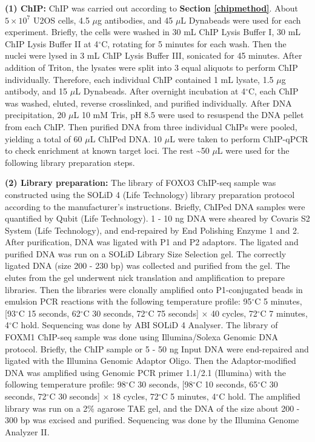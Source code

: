 \textbf{(1) ChIP:} ChIP was carried out according to \textbf{Section \ref{chipmethod}}. About $5 \times 10^7$ U2OS cells, 4.5 $\mu$g antibodies, and 45 $\mu$L Dynabeads were used for each experiment. Briefly, the cells were washed in 30 mL ChIP Lysis Buffer I, 30 mL ChIP Lysis Buffer II at 4$^\circ$C, rotating for 5 minutes for each wash. Then the nuclei were lysed in 3 mL ChIP Lysis Buffer III, sonicated for 45 minutes. After addition of Triton, the lysates were split into 3 equal aliquots to perform ChIP individually. Therefore, each individual ChIP contained 1 mL lysate, 1.5 $\mu$g antibody, and 15 $\mu$L Dynabeads. After overnight incubation at 4$^\circ$C, each ChIP was washed, eluted, reverse crosslinked, and purified individually. After DNA precipitation, 20 $\mu$L 10 mM Tris, pH 8.5 were used to resuspend the DNA pellet from each ChIP. Then purified DNA from three individual ChIPs were pooled, yielding a total of 60 $\mu$L ChIPed DNA. 10 $\mu$L were taken to perform ChIP-qPCR to check enrichment at known target loci. The rest \textasciitilde 50 $\mu$L were used for the following library preparation steps.

\textbf{(2) Library preparation:} The library of FOXO3 ChIP-seq sample was constructed using the SOLiD 4 (Life Technology) library preparation protocol according to the manufacturer's instructions. Briefly, ChIPed DNA samples were quantified by Qubit (Life Technology). 1 - 10 ng DNA were sheared by Covaris S2 System (Life Technology), and end-repaired by End Polishing Enzyme 1 and 2. After purification, DNA was ligated with P1 and P2 adaptors. The ligated and purified DNA was run on a SOLiD Library Size Selection gel. The correctly ligated DNA (size 200 - 230 bp) was collected and purified from the gel. The elutes from the gel underwent nick translation and amplification to prepare libraries. Then the libraries were clonally amplified onto P1-conjugated beads in emulsion PCR reactions with the following temperature profile: 95$^\circ$C 5 minutes, [93$^\circ$C 15 seconds, 62$^\circ$C 30 seconds, 72$^\circ$C 75 seconds] $\times$ 40 cycles, 72$^\circ$C 7 minutes, 4$^\circ$C hold. Sequencing was done by ABI SOLiD 4 Analyser. The library of FOXM1 ChIP-seq sample was done using Illumina/Solexa Genomic DNA protocol. Briefly, the ChIP sample or 5 - 50 ng Input DNA were end-repaired and ligated with the Illumina Genomic Adaptor Oligo. Then the Adaptor-modified DNA was amplified using Genomic PCR primer 1.1/2.1 (Illumina) with the following temperature profile: 98$^\circ$C 30 seconds, [98$^\circ$C 10 seconds, 65$^\circ$C 30 seconds, 72$^\circ$C 30 seconds] $\times$ 18 cycles, 72$^\circ$C 5 minutes, 4$^\circ$C hold. The amplified library was run on a 2\% agarose TAE gel, and the DNA of the size about 200 - 300 bp was excised and purified. Sequencing was done by the Illumina Genome Analyzer II.

